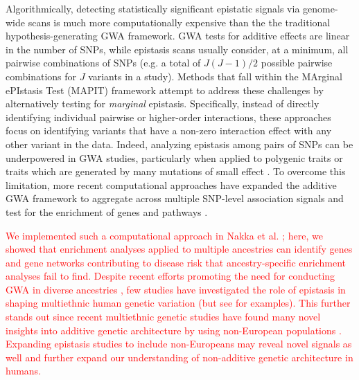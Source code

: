 \documentclass[10pt]{article}
\begin{document}
Algorithmically, detecting statistically significant epistatic signals via genome-wide scans is much more computationally expensive than the the traditional hypothesis-generating GWA framework. GWA tests for additive effects are linear in the number of SNPs, while epistasis scans usually consider, at a minimum, all pairwise combinations of SNPs (e.g. a total of $J(J - 1)/2$ possible pairwise combinations for $J$ variants in a study). Methods that fall within the MArginal ePIstasis Test (MAPIT) framework \cite{Crawford2017a,Crawford2018b,Moore2019,Wang2019} attempt to address these challenges by alternatively testing for \textit{marginal} epistasis. Specifically, instead of directly identifying individual pairwise or higher-order interactions, these approaches focus on identifying variants that have a non-zero interaction effect with any other variant in the data. Indeed, analyzing epistasis among pairs of SNPs can be underpowered in GWA studies, particularly when applied to polygenic traits or traits which are generated by many mutations of small effect \cite{Zhou2013,Yang2014,Bulik-Sullivan2015,Wray2018}. To overcome this limitation, more recent computational approaches have expanded the additive GWA framework to aggregate across multiple SNP-level association signals and test for the enrichment of genes and pathways \cite{Subramanian2005,Cantor2010,Wang2010b,Lee2012,Carbonetto2013,Mooney2014,Gamazon2015,de2016,Nakka2016,Zhu2018,Sun2019,Cheng2020}. 

\textcolor{red}{We implemented such a computational approach in Nakka et al. \cite{Nakka2017}; here, we showed that enrichment analyses applied to multiple ancestries can identify genes and gene networks contributing to disease risk that ancestry-specific enrichment analyses fail to find. Despite recent efforts promoting the need for conducting GWA in diverse ancestries \cite{Popejoy2016,Martin2018,Martin2019,Gurdasani2019,Sirugo2019,Wojcik2019}, few studies have investigated the role of epistasis in shaping multiethnic human genetic variation (but see \cite{Ma2012,Fish2016,Choquet2018,Hoffmann2018} for examples). This further stands out since recent multiethnic genetic studies have found many novel insights into additive genetic architecture by using non-European populations \cite{Martin2017b,Crawford2017b,Duncan2019,Kuchenbaecker2019,Zhong2019,Wojcik2019,Chen2020,Marnetto2020}. Expanding epistasis studies to include non-Europeans may reveal novel signals as well and further expand our understanding of non-additive genetic architecture in humans.} 
\end{document}
